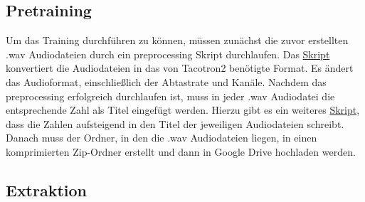 \subsection{Pretraining}
Um das Training durchführen zu können, müssen zunächst die zuvor erstellten .wav Audiodateien durch ein preprocessing Skript durchlaufen. Das \href{https://github.com/rasmurtech/Tacotron-2-Audio-Preprocessor/blob/main/tacotron2_preprocessor_wav_files.py}{Skript} konvertiert die Audiodateien in das von Tacotron2 benötigte Format. Es ändert das Audioformat, einschließlich der Abtastrate und Kanäle.\newline
Nachdem das preprocessing erfolgreich durchlaufen ist, muss in jeder .wav Audiodatei die entsprechende Zahl als Titel eingefügt werden. Hierzu gibt es ein weiteres \href{https://github.com/rasmurtech/Audio-Metadata-Updater/blob/main/audio_metadata_updater.py}{Skript}, dass die Zahlen aufsteigend in den Titel der jeweiligen Audiodateien schreibt.\newline
Danach muss der Ordner, in den die .wav Audiodateien liegen, in einen komprimierten Zip-Ordner erstellt und dann in Google Drive hochladen werden.
\subsection{Extraktion}
